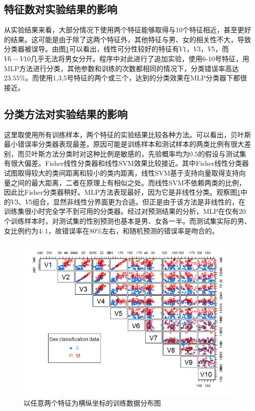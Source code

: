 \subsection{特征数对实验结果的影响}
从实验结果来看，大部分情况下使用两个特征能够取得与10个特征相近，甚至更好的结果。这可能是由于除了这两个特征外，其他特征与男、女的相关性不大，导致分类器被误导。由图\ref{fig:fr}可以看出，线性可分性较好的特征有$V1$，$V3$，$V5$，而$V6-V10$几乎无法将男女分开。程序中对此进行了追加实验，使用6-10号特征，用MLP方法进行分类，其他参数和训练的次数都相同的情况下，分类错误率高达$23.55\%$。而使用1,3,5号特征的两个或三个，达到的分类效果在MLP分类器下都很接近。
\subsection{分类方法对实验结果的影响}
这里取使用所有训练样本，两个特征的实验结果比较各种方法。可以看出，贝叶斯最小错误率分类器表现最差。原因可能是训练样本和测试样本的两类比例有很大差别，而贝叶斯方法分类时对这种比例是敏感的，先验概率均为$0.5$的假设与测试集有很大偏差。Fisher线性分类器和线性SVM效果比较接近。其中Fisher线性分类器试图取得较大的类间距离和较小的类内距离，线性SVM基于支持向量取得支持向量之间的最大距离，二者在原理上有相似之处。而线性SVM不依赖两类的比例，因此比Fisher分类器稍好。MLP方法表现最好，因为它是非线性分类。观察图\ref{fig:fr}中的$V3$、$V5$组合，显然非线性分界面更为合适。但正是由于该方法是非线性的，在训练集很小时完全学不到可用的分类器。经过对预测结果的分析，MLP在仅有20个训练样本时，对测试集的性别预测也基本是男、女各一半。而测试集实际的男、女比例约为$4:1$，故错误率在$80\%$左右，和随机预测的错误率是吻合的。

\begin{figure}
\centering
\includegraphics[width=15cm]{resource/feature_relation.png}
\caption{以任意两个特征为横纵坐标的训练数据分布图}
\label{fig:fr}
\end{figure}

